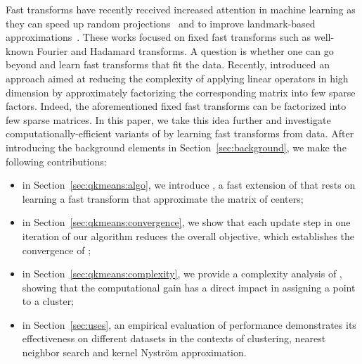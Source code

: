 Fast transforms have recently received increased attention in machine learning as they can speed up random projections~\cite{le2013fastfood,gittens2016revisiting} and to improve landmark-based approximations~\cite{si2016computationally}.
%
These works focused on fixed fast transforms such as well-known Fourier and Hadamard transforms.
A question is whether one can go beyond and learn fast transforms that fit the data. 
%
Recently, \citet{LeMagoarou2016Flexible} introduced an approach aimed  at  reducing the  complexity  of  applying  linear  operators  in  high  dimension by   approximately   factorizing   the   corresponding   matrix   into few   sparse   factors. 
Indeed, the aforementioned fixed fast transforms can be factorized into few sparse matrices.
%
In this paper, we take this idea further and investigate computationally-efficient variants of \kmeans by learning fast transforms from data.
%
After introducing the background elements in Section~\ref{sec:background}, we make the following contributions:
\begin{itemize}
	\item in Section~\ref{sec:qkmeans:algo}, we introduce \qkmeans, a fast extension of \kmeans that rests on learning a fast transform that approximate the matrix of centers;
	\item in Section~\ref{sec:qkmeans:convergence}, we show that each update step in one iteration of our algorithm  reduces the overall objective, which establishes the convergence of \qkmeans;
	\item in Section~\ref{sec:qkmeans:complexity}, we provide a complexity analysis of \qkmeans, showing that the computational gain has a direct impact in assigning a point to a cluster;
	\item in Section~\ref{sec:uses}, an empirical evaluation of \qkmeans  performance demonstrates its effectiveness on different datasets in the contexts of clustering, nearest neighbor search and kernel Nystr\"om approximation.
\end{itemize}


